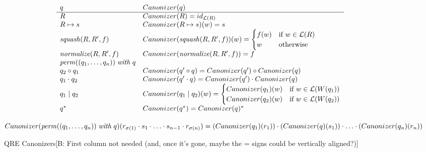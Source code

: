 \documentclass{svproc}
\newcommand{\FINISH}[3]{\ifdraft\textcolor{#1}{[#2: #3]}\fi}
\newcommand{\bcp}[1]{\FINISH{dkred}{B}{#1}}
\newcommand{\squash}[3]{\ensuremath{\mathit{squash}(#1, #2, #3)}}
\newcommand{\perm}[2]{\ensuremath{\mathit{perm}(#1)\; \mathit{with}\; #2}}
\newcommand{\normalize}[3]{\ensuremath{\mathit{normalize}(#1, #2, #3)}}
\newcommand{\sep}{\ensuremath{\; | \;}}
\begin{document}
\begin{figure}[t]
  \begin{center}
\[
    \begin{array}{l@{\quad}l} 
      q & Canonizer(q)  \\ \hline
      R & Canonizer(R) = id_{\mathcal{L}(R)} \\
      R \mapsto s & Canonizer(R \mapsto s)(w) = s\\
      \squash{R}{R'}{f} & Canonizer(\squash{R}{R'}{f})(w) = 
\begin{cases}
f(w) & \text{if } w \in \mathcal{L}(R)\\
w & \text{otherwise}
\end{cases}\\
      \normalize{R}{R'}{f} & Canonizer(\normalize{R}{R'}{f}) = f\\
      \perm{(q_1, \ldots, q_n)}{q} & \\
      q_2 \circ  q_1 & Canonizer(q' \circ q) = Canonizer(q') \circ Canonizer(q)\\
      q_1 \cdot q_2 & Canonizer(q' \cdot q) = Canonizer(q') \cdot Canonizer(q)\\
      q_1 \sep q_2 &  Canonizer(q_1 \sep q_2)(w) = 
\begin{cases}
Canonizer(q_1)(w) & \text{if } w \in \mathcal{L}(W(q_1))\\
Canonizer(q_2)(w) & \text{if } w \in \mathcal{L}(W(q_2))\\
\end{cases}\\
      q^* &  Canonizer(q^*) = Canonizer(q)^* \\
    \end{array}
    \]
    \end{center}
    $Canonizer(\perm{(q_1, \ldots, q_n)}{q})(r_{\sigma(1)}
\cdot s_1 \cdot \ldots \cdot s_{n-1} \cdot r_{\sigma(n)}) \newline
= (Canonizer(q_1)(r_1)) \cdot (Canonizer(q)(s_1)) \cdot \ldots \cdot
(Canonizer(q_n)(r_n))$
  \caption{QRE Canonizers\bcp{First column not needed (and, once it's gone,
      maybe the = signs could be vertically aligned?)}}
  \label{fig:canonizers}
\end{figure}
\end{document}
